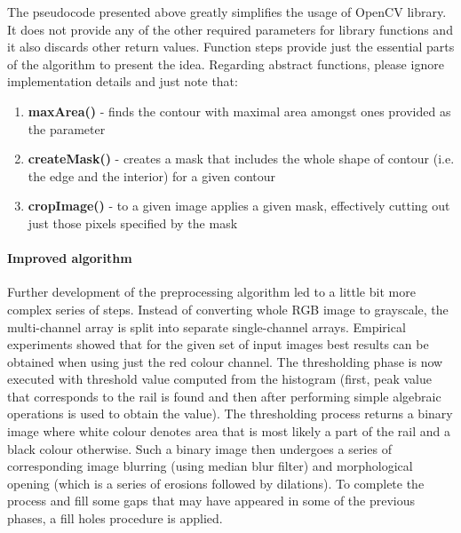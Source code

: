 The pseudocode presented above greatly simplifies the usage of OpenCV library. It does not provide any of the other required parameters for library functions and it also discards other return values. Function steps provide just the essential parts of the algorithm to present the idea. Regarding abstract functions, please ignore implementation details and just note that:
\begin{enumerate}
	\item \textbf{maxArea()} - finds the contour with maximal area amongst ones provided as the parameter
	\item \textbf{createMask()} - creates a mask that includes the whole shape of contour (i.e. the edge and the interior) for a given contour
	\item \textbf{cropImage()} - to a given image applies a given mask, effectively cutting out just those pixels specified by the mask 
\end{enumerate}

\paragraph{Improved algorithm}
Further development of the preprocessing algorithm led to a little bit more complex series of steps. Instead of converting whole RGB image to grayscale, the multi-channel array is split into separate single-channel arrays. Empirical experiments showed that for the given set of input images best results can be obtained when using just the red colour channel. The thresholding phase is now executed with threshold value computed from the histogram (first, peak value that corresponds to the rail is found and then after performing simple algebraic operations is used to obtain the value). The thresholding process returns a binary image where white colour denotes area that is most likely a part of the rail and a black colour otherwise. Such a binary image then undergoes a series of corresponding image blurring (using median blur filter) and morphological opening (which is a series of erosions followed by dilations). To complete the process and fill some gaps that may have appeared in some of the previous phases, a fill holes procedure is applied.

